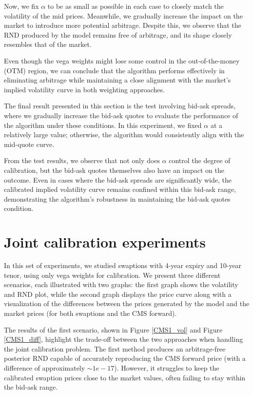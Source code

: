 Now, we fix \(\alpha\) to be as small as possible in each case to closely match the volatility of the mid prices. 
Meanwhile, we gradually increase the impact on the market to introduce more potential arbitrage. 
Despite this, we observe that the RND produced by the model remains free of arbitrage, 
and its shape closely resembles that of the market.

Even though the vega weights might lose some control in the out-of-the-money (OTM) region, 
we can conclude that the algorithm performs effectively in eliminating arbitrage while maintaining a close 
alignment with the market's implied volatility curve in both weighting approaches.

The final result presented in this section is the test involving bid-ask spreads, where we gradually increase the bid-ask quotes 
to evaluate the performance of the algorithm under these conditions. 
In this experiment, we fixed \(\alpha\) at a relatively large value; otherwise, the algorithm would consistently align with the 
mid-quote curve.

From the test results, we observe that not only does \(\alpha\) control the degree of calibration, but the bid-ask quotes themselves 
also have an impact on the outcome. Even in cases where the bid-ask spreads are significantly wide, 
the calibrated implied volatility curve remains confined within this bid-ask range, demonstrating the algorithm's robustness in 
maintaining the bid-ask quotes condition.

\section{Joint calibration experiments}
In this set of experiments, we studied swaptions with 4-year expiry and 10-year tenor, using only vega weights for calibration. 
We present three different scenarios, each illustrated with two graphs: the first graph shows the volatility and RND plot, 
while the second graph displays the price curve along with a visualization of the differences between the prices generated by the model 
and the market prices (for both swaptions and the CMS forward).

The results of the first scenario, shown in Figure \ref{CMS1_vol} and Figure \ref{CMS1_diff}, 
highlight the trade-off between the two approaches when handling the joint calibration problem. 
The first method produces an arbitrage-free posterior RND capable of accurately reproducing the CMS forward price 
(with a difference of approximately \( \sim 1e-17 \)). However, it struggles to keep the calibrated swaption prices close to the market values, 
often failing to stay within the bid-ask range. 

